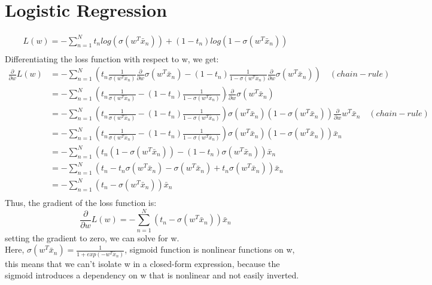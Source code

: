 \documentclass{article}
\begin{document}
\section{Logistic Regression}
\[
    \begin{aligned}
    L(w) = -\sum_{n=1}^{N} t_{n}log(\sigma(w^{T}\bar{x}_{n})) + (1-t_{n})log(1-\sigma(w^{T}\bar{x}_{n})) \\    
    \end{aligned}
\]
Differentiating the loss function with respect to w, we get:
\[
    \begin{aligned}
        \frac{\partial}{\partial w} L(w) 
        &= -\sum_{n=1}^{N} \left(t_{n}\frac{1}{\sigma(w^{T}\bar{x}_{n})}\frac{\partial}{\partial w}\sigma(w^{T}\bar{x}_{n})-(1-t_{n})\frac{1}{1-\sigma(w^{T}\bar{x}_{n})}\frac{\partial}{\partial w}\sigma(w^{T}\bar{x}_{n})\right) \hspace{1em} (chain-rule) \\
        &= -\sum_{n=1}^{N} \left(t_{n}\frac{1}{\sigma(w^{T}\bar{x}_{n})}-(1-t_{n})\frac{1}{1-\sigma(w^{T}\bar{x}_{n})}\right)\dot{}\frac{\partial}{\partial w}\sigma(w^{T}\bar{x}_{n}) \\
        &= -\sum_{n=1}^{N} \left(t_{n}\frac{1}{\sigma(w^{T}\bar{x}_{n})}-(1-t_{n})\frac{1}{1-\sigma(w^{T}\bar{x}_{n})}\right)\sigma(w^{T}\bar{x}_{n})(1-\sigma(w^{T}\bar{x}_{n}))\frac{\partial}{\partial w}w^{T}\bar{x}_{n} \hspace{1em} (chain-rule) \\
        &= -\sum_{n=1}^{N} \left(t_{n}\frac{1}{\sigma(w^{T}\bar{x}_{n})}-(1-t_{n})\frac{1}{1-\sigma(w^{T}\bar{x}_{n})}\right)\sigma(w^{T}\bar{x}_{n})(1-\sigma(w^{T}\bar{x}_{n}))\bar{x}_{n} \\
        &= -\sum_{n=1}^{N} \left(t_{n}(1-\sigma(w^{T}\bar{x}_{n}))-(1-t_{n})\sigma(w^{T}\bar{x}_{n})\right)\bar{x}_{n} \\
        &= -\sum_{n=1}^{N} \left(t_{n}-t_{n}\sigma(w^{T}\bar{x}_{n})-\sigma(w^{T}\bar{x}_{n})+t_{n}\sigma(w^{T}\bar{x}_{n})\right)\bar{x}_{n} \\
        &= -\sum_{n=1}^{N} \left(t_{n}-\sigma(w^{T}\bar{x}_{n})\right)\bar{x}_{n} \\
    \end{aligned}
\]
Thus, the gradient of the loss function is:
\[
    \frac{\partial}{\partial w} L(w)  = -\sum_{n=1}^{N} \left(t_{n}-\sigma(w^{T}\bar{x}_{n})\right)\bar{x}_{n}
\]
setting the gradient to zero, we can solve for w. \\
Here, $\sigma(w^{T}\bar{x}_{n}) = \frac{1}{1+exp(-w^{T}\bar{x}_{n})}$, sigmoid function is nonlinear functions on w, this means that we can't isolate w in a closed-form expression, because the sigmoid introduces a dependency on w that is nonlinear and not easily inverted. \\
\end{document}
